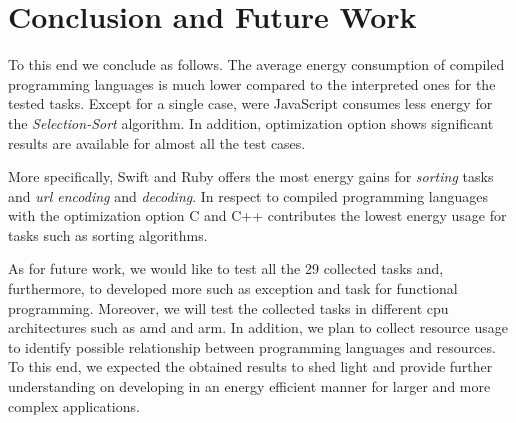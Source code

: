 \section{Conclusion and Future Work} \label{conclusiona_and_future_work}
To this end we conclude as follows. 
The average energy consumption of compiled programming languages is 
much lower compared to the interpreted ones for the tested tasks. 
Except for a single case, were JavaScript consumes less energy for 
the \textit{Selection-Sort} algorithm. 
In addition, optimization option shows significant results are 
available for almost all the test cases.

More specifically, Swift and Ruby offers the most energy gains 
for \textit{sorting} tasks and \textit{url encoding} and 
\textit{decoding}.
In respect to compiled programming languages with the optimization 
option C and  C++ contributes the lowest energy usage for tasks 
such as sorting algorithms.

As for future work, we would like to test all the 29 collected 
tasks and, furthermore, to developed more such as exception 
and task for functional programming. 
Moreover, we will test the collected tasks in different {\sc cpu} 
architectures such as {\sc amd} and {\sc arm}. 
In addition, we plan to collect resource usage to identify 
possible relationship between programming  languages and 
resources. 
To this end, we expected the obtained results to shed light 
and provide further understanding on developing in an energy 
efficient manner for larger and  more complex applications.



